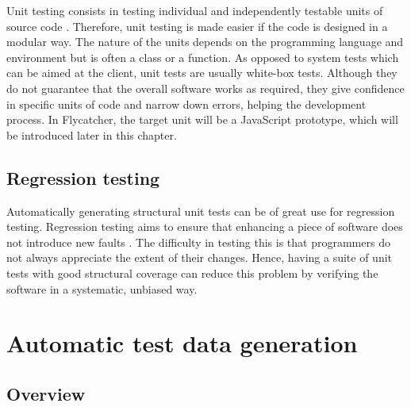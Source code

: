 \documentclass[a4paper,11pt,titlepage]{report}
\begin{document}
Unit testing consists in testing individual and independently testable units of source code \cite{myers2011art}. Therefore, unit testing is made easier if the code is designed in a modular way. The nature of the units depends on the programming language and environment but is often a class or a function. As opposed to system tests which can be aimed at the client, unit tests are usually white-box tests. Although they do not guarantee that the overall software works as required, they give confidence in specific units of code and narrow down errors, helping the development process. In Flycatcher, the target unit will be a JavaScript prototype, which will be introduced later in this chapter.

\subsection{Regression testing}
Automatically generating structural unit tests can be of great use for regression testing. Regression testing aims to ensure that enhancing a piece of software does not introduce new faults \cite{myers2011art}. The difficulty in testing this is that programmers do not always appreciate the extent of their changes. Hence, having a suite of unit tests with good structural coverage can reduce this problem by verifying the software in a systematic, unbiased way.

\section{Automatic test data generation}
\subsection{Overview}
\end{document}
